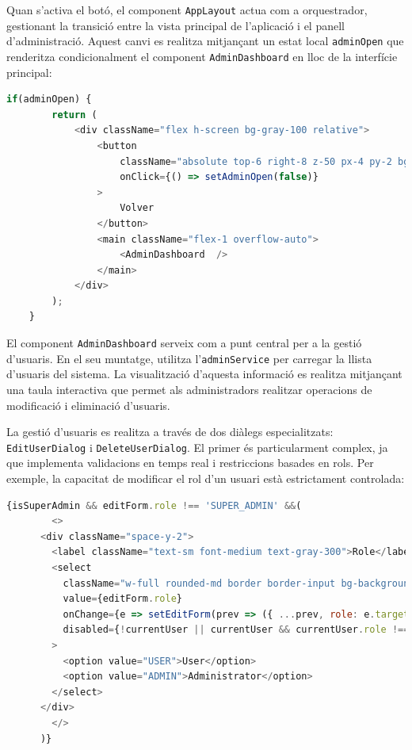 Quan s'activa el botó, el component \texttt{AppLayout} actua com a orquestrador, gestionant la transició entre la vista principal de l'aplicació i el panell d'administració. Aquest canvi es realitza mitjançant un estat local \texttt{adminOpen} que renderitza condicionalment el component \texttt{AdminDashboard} en lloc de la interfície principal:

\begin{lstlisting}[language=javascript, caption={Renderitzat condicional del panell d'administració a `AppLayout`}]
    if(adminOpen) {
		return (
			<div className="flex h-screen bg-gray-100 relative">
				<button
					className="absolute top-6 right-8 z-50 px-4 py-2 bg-indigo-600 text-white rounded-lg shadow hover:bg-indigo-700 transition-colors font-semibold"
					onClick={() => setAdminOpen(false)}
				>
					Volver
				</button>
				<main className="flex-1 overflow-auto">
					<AdminDashboard  />
				</main>
			</div>
		);
	}
\end{lstlisting}

El component \texttt{AdminDashboard} serveix com a punt central per a la gestió d'usuaris. En el seu muntatge, utilitza l'\texttt{adminService} per carregar la llista d'usuaris del sistema. La visualització d'aquesta informació es realitza mitjançant una taula interactiva que permet als administradors realitzar operacions de modificació i eliminació d'usuaris.

La gestió d'usuaris es realitza a través de dos diàlegs especialitzats: \texttt{EditUserDialog} i \texttt{DeleteUserDialog}. El primer és particularment complex, ja que implementa validacions en temps real i restriccions basades en rols. Per exemple, la capacitat de modificar el rol d'un usuari està estrictament controlada:

\begin{lstlisting}[language=javascript, caption={Control d'accés per a la modificació de rols}]
    {isSuperAdmin && editForm.role !== 'SUPER_ADMIN' &&(
        <>
      <div className="space-y-2">
        <label className="text-sm font-medium text-gray-300">Role</label>
        <select
          className="w-full rounded-md border border-input bg-background px-3 py-2"
          value={editForm.role}
          onChange={e => setEditForm(prev => ({ ...prev, role: e.target.value as 'USER' | 'ADMIN' | 'SUPER_ADMIN' }))}
          disabled={!currentUser || currentUser && currentUser.role !== 'SUPER_ADMIN' || (currentUser.role === 'ADMIN' && user.role === 'ADMIN')}
        >
          <option value="USER">User</option>
          <option value="ADMIN">Administrator</option>
        </select>
      </div>
        </>
      )}
\end{lstlisting}

